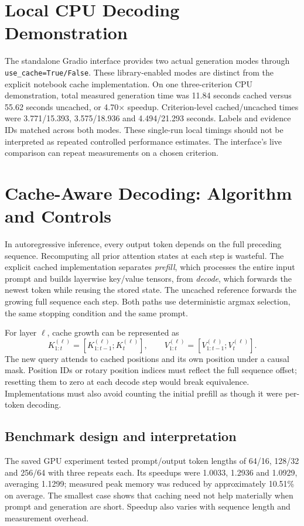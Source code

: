 \documentclass[conference]{IEEEtran}
\begin{document}
\section{Local CPU Decoding Demonstration}
The standalone Gradio interface provides two actual generation modes through \texttt{use\_cache=True/False}. These library-enabled modes are distinct from the explicit notebook cache implementation. On one three-criterion CPU demonstration, total measured generation time was 11.84 seconds cached versus 55.62 seconds uncached, or 4.70$\times$ speedup. Criterion-level cached/uncached times were 3.771/15.393, 3.575/18.936 and 4.494/21.293 seconds. Labels and evidence IDs matched across both modes. These single-run local timings should not be interpreted as repeated controlled performance estimates. The interface's live comparison can repeat measurements on a chosen criterion.


\section{Cache-Aware Decoding: Algorithm and Controls}
In autoregressive inference, every output token depends on the full preceding sequence. Recomputing all prior attention states at each step is wasteful. The explicit cached implementation separates \emph{prefill}, which processes the entire input prompt and builds layerwise key/value tensors, from \emph{decode}, which forwards the newest token while reusing the stored state. The uncached reference forwards the growing full sequence each step. Both paths use deterministic argmax selection, the same stopping condition and the same prompt.

For layer $\ell$, cache growth can be represented as
\begin{equation}
K^{(\ell)}_{1:t}=[K^{(\ell)}_{1:t-1};K^{(\ell)}_t],\qquad
V^{(\ell)}_{1:t}=[V^{(\ell)}_{1:t-1};V^{(\ell)}_t].
\end{equation}
The new query attends to cached positions and its own position under a causal mask. Position IDs or rotary position indices must reflect the full sequence offset; resetting them to zero at each decode step would break equivalence. Implementations must also avoid counting the initial prefill as though it were per-token decoding.

\subsection{Benchmark design and interpretation}
The saved GPU experiment tested prompt/output token lengths of 64/16, 128/32 and 256/64 with three repeats each. Its speedups were 1.0033, 1.2936 and 1.0929, averaging 1.1299; measured peak memory was reduced by approximately 10.51\% on average. The smallest case shows that caching need not help materially when prompt and generation are short. Speedup also varies with sequence length and measurement overhead.
\end{document}
